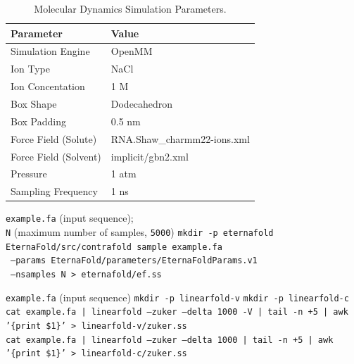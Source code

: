 \begin{table}[H]
  \centering
  \begin{tabular}{ll}
    \toprule
    \textbf{Parameter}            & \textbf{Value}                    \\
    \midrule
    Simulation Engine             & OpenMM                            \\
    Ion Type                      & NaCl                              \\
    Ion Concentation              & 1 M                                \\
    Box Shape                     & Dodecahedron                      \\
    Box Padding                   & 0.5 nm                            \\
    Force Field (Solute)           & RNA.Shaw\_charmm22-ions.xml       \\
    Force Field (Solvent)          & implicit/gbn2.xml                 \\
    Pressure                      & 1 atm                             \\
    Sampling Frequency            & 1 ns                              \\
    \bottomrule
  \end{tabular}
  \caption{Molecular Dynamics Simulation Parameters.}
\label{ch6:tab:parameters}
\end{table}

\begin{algorithm}[H]
  \caption{Sampling RNA secondary structures with \texttt{EternaFold}}
  \label{ch6:alg:eternafold-sampling}
  \begin{algorithmic}[1]
    \REQUIRE \texttt{example.fa} (input sequence);\\
    \texttt{N} (maximum number of samples, \texttt{5000})
    \STATE \texttt{mkdir -p eternafold}
    \STATE \texttt{EternaFold/src/contrafold sample example.fa} \\
    \ \texttt{--params EternaFold/parameters/EternaFoldParams.v1} \\
    \ \texttt{--nsamples N > eternafold/ef.ss}
  \end{algorithmic}
\end{algorithm}

\begin{algorithm}[H]
  \caption{Sampling RNA secondary structures with \texttt{LinearFold}}
  \label{ch6:alg:linearfold-sampling}
  \begin{algorithmic}[1]
    \REQUIRE \texttt{example.fa} (input sequence)
    \STATE \texttt{mkdir -p linearfold-v}
    \STATE \texttt{mkdir -p linearfold-c}
    \STATE \texttt{cat example.fa | linearfold --zuker --delta 1000 -V | tail -n +5 | awk '\{print \$1\}' > linearfold-v/zuker.ss} \\
    \STATE \texttt{cat example.fa | linearfold --zuker --delta 1000       | tail -n +5 | awk '\{print \$1\}' > linearfold-c/zuker.ss}
  \end{algorithmic}
\end{algorithm}

